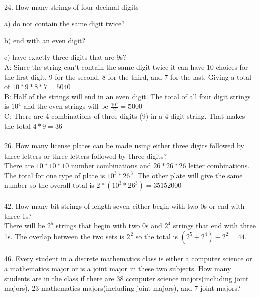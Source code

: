 \documentclass[12]{article}
\begin{document}
\hrulefill\\

24. How many strings of four decimal digits

a) do not contain the same digit twice?

b) end with an even digit?

c) have exactly three digits that are 9s?\\

A: Since the string can't contain the same digit twice it can have 10 choices for the first digit, 9 for the second, 8 for the third, and 7 for the last.  Giving a total of $10*9*8*7 = 5040 $\\

B: Half of the strings will end in an even digit. The total of all four digit strings is $10^4$ and the even strings will be $\frac{10^4}{2} = 5000$\\

C: There are 4 combinations of three digits (9) in a 4 digit string.  That makes the total $4*9 = 36$\\

\hrulefill\\

26. How many license plates can be made using either three digits
followed by three letters
or three letters followed by three digits?\\

There are $10*10*10$ number combinations and $26*26*26$ letter combinations. The total for one type of plate is $10^3*26^3$.  The other plate will give the same number so the overall total is $2*(10^3*26^3) = 35152000$\\

\hrulefill\\

42. How many bit strings of length seven either begin with two 0s
or end with three 1s?\\

There will be $2^5$ strings that begin with two 0s and $2^4$ strings that end with three 1s.  The overlap between the two sets is $2^2$ so the total is $(2^5+2^4)-2^2=44$.\\

\hrulefill\\

46. Every student in a discrete mathematics class is either a computer science or a mathematics major or is a joint major in these two subjects. How many students are in the
class if there are 38 computer science majors(including joint majors), 23 mathematics majors(including joint majors), and 7 joint majors?\\
\end{document}
